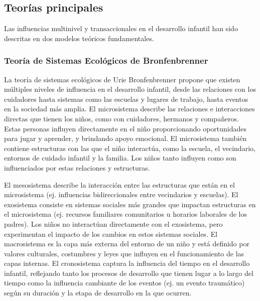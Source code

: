 \documentclass[11pt,letterpaper]{report}
\begin{document}
\subsection{Teorías principales}
Las influencias multinivel y transaccionales en el desarrollo infantil han sido
descritas en dos modelos teóricos fundamentales.

\subsubsection{Teoría de Sistemas Ecológicos de Bronfenbrenner}
La teoría de sistemas ecológicos de Urie Bronfenbrenner propone que existen
múltiples niveles de influencia en el desarrollo infantil, desde las relaciones
con los cuidadores hasta sistemas como las escuelas y lugares de trabajo, hasta
eventos en la sociedad más amplia. El microsistema describe las relaciones e
interacciones directas que tienen los niños, como con cuidadores, hermanos y
compañeros. Estas personas influyen directamente en el niño proporcionando
oportunidades para jugar y aprender, y brindando apoyo emocional. El
microsistema también contiene estructuras con las que el niño interactúa, como
la escuela, el vecindario, entornos de cuidado infantil y la familia. Los niños
tanto influyen como son influenciados por estas relaciones y estructuras.
\cite{Feldman3}

El mesosistema describe la interacción entre las estructuras que están en el
microsistema (ej. influencias bidireccionales entre vecindarios y escuelas).
El exosistema consiste en sistemas sociales más grandes que impactan
estructuras en el microsistema (ej. recursos familiares comunitarios u horarios
laborales de los padres). Los niños no interactúan directamente con el
exosistema, pero experimentan el impacto de los cambios en estos sistemas
sociales. El macrosistema es la capa más externa del entorno de un niño y está
definido por valores culturales, costumbres y leyes que influyen en el
funcionamiento de las capas internas. El cronosistema captura la influencia del
tiempo en el desarrollo infantil, reflejando tanto los procesos de desarrollo
que tienen lugar a lo largo del tiempo como la influencia cambiante de los
eventos (ej. un evento traumático) según su duración y la etapa de desarrollo
en la que ocurren. \cite{Feldman3}
\end{document}
